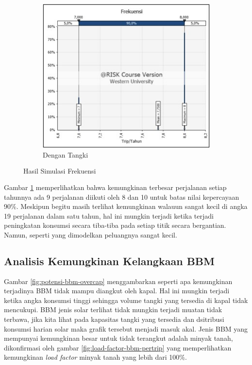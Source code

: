 \begin{figure}[!ht]
\begin{subfigure}{0.4\textwidth}
        \includegraphics[width=\textwidth]{grafik/frekuensi-baru-tangki.jpg}
        \caption{Dengan Tangki}    
    \end{subfigure}
    \caption{Hasil Simulasi Frekuensi}
    \label{fig:annual-freq-dist}
\end{figure}

Gambar \ref{fig:annual-freq-dist} memperlihatkan bahwa kemungkinan terbesar perjalanan setiap tahunnya ada 9 perjalanan diikuti oleh 8 dan 10 untuk batas nilai kepercayaan 90\%. Meskipun begitu masih terlihat kemungkinan walauun sangat kecil di angka 19 perjalanan dalam satu tahun, hal ini mungkin terjadi ketika terjadi peningkatan konsumsi secara tiba-tiba pada setiap titik secara bergantian. Namun, seperti yang dimodelkan peluangnya sangat kecil.


\subsection{Analisis Kemungkinan Kelangkaan BBM}
\label{subsec:stock-out-over-capacity}

Gambar \ref{fig:potensi-bbm-overcap} menggambarkan seperti apa kemungkinan terjadinya BBM tidak mampu diangkut oleh kapal. Hal ini mungkin terjadi ketika angka konsumsi tinggi sehingga volume tangki yang tersedia di kapal tidak mencukupi. BBM jenis solar terlihat tidak mungkin terjadi muatan tidak terbawa, jika kita lihat pada kapasitas tangki yang tersedia dan dsitribusi konsumsi harian solar maka grafik tersebut menjadi masuk akal. Jenis BBM yang mempunyai kemungkinan besar untuk tidak terangkut adalah minyak tanah, dikonfirmasi oleh gambar \ref{fig:load-factor-bbm-pertrip} yang memperlihatkan kemungkinan \emph{load factor} minyak tanah yang lebih dari 100\%.

